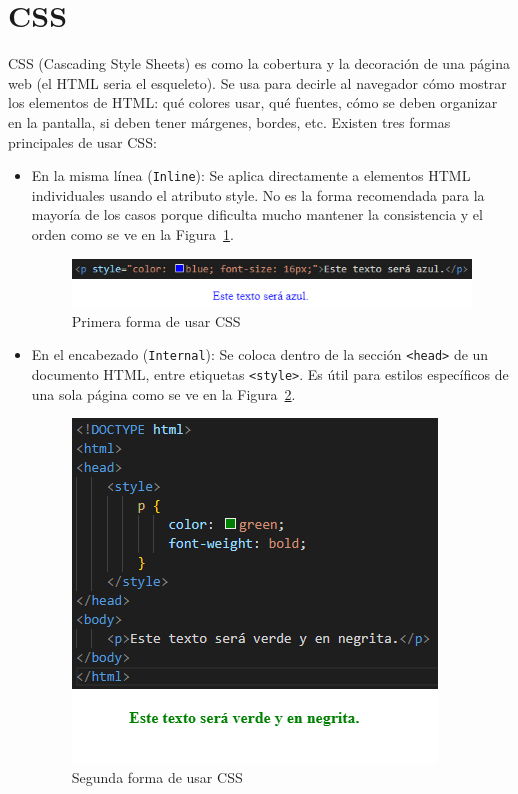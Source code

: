 \documentclass[a4paper, 12pt]{book}
\let\cleardoublepage\clearpage
\begin{document}
\cleardoublepage
\section{CSS} 
\label{sec:seccion8}
CSS (Cascading Style Sheets) es como la cobertura y la decoración de una página web (el HTML seria el esqueleto). Se usa para decirle al navegador cómo mostrar los elementos de HTML: qué colores usar, qué fuentes, cómo se deben organizar en la pantalla, si deben tener márgenes, bordes, etc. Existen tres formas principales de usar CSS:

\begin{itemize}
  \item En la misma línea (\texttt{Inline}): Se aplica directamente a elementos HTML individuales usando el atributo style. No es la forma recomendada para la mayoría de los casos porque dificulta mucho mantener la consistencia y el orden como se ve en la Figura~\ref{fig:Style_line}.
\begin{figure}[H]
    \centering
    \includegraphics[width=0.8\linewidth]{img/style1.png}
    \caption{Primera forma de usar CSS}
    \label{fig:Style_line}
\end{figure}

\item En el encabezado (\texttt{Internal}): Se coloca dentro de la sección \texttt{<head>} de un documento HTML, entre etiquetas \texttt{<style>}. Es útil para estilos específicos de una sola página como se ve en la Figura~\ref{fig:Style_Internal}.
\begin{figure}[H]
    \centering
    \includegraphics[width=0.6\linewidth]{img/Style2.png}
    \caption{Segunda forma de usar CSS}
    \label{fig:Style_Internal}
\end{figure}


\end{itemize}
\end{document}
